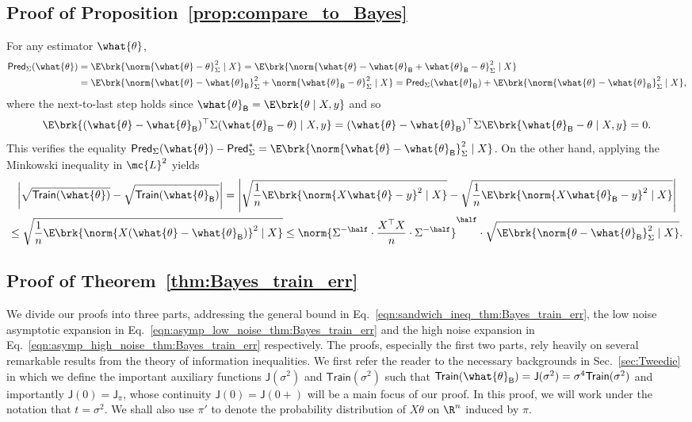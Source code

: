 \documentclass[11pt]{article}
\newcommand{\bysest}{\what{\theta}_{\mathsf{B}}}
\newcommand{\trerr}{\mathsf{Train}}
\newcommand{\prerr}{\mathsf{Pred}}
\newcommand{\tfunc}{\mathsf{Train}}
\newcommand{\jfunc}{\mathsf{J}}
\begin{document}
\subsection{Proof of Proposition~\ref{prop:compare_to_Bayes}}
    For any estimator $\what{\theta}$,
\begin{align}
    \prerr_\Sigma(\what{\theta}) & = \E \brk{ \norm{\what{\theta} - \theta}_\Sigma^2 \mid X} = \E \brk{ \norm{\what{\theta} - \bysest+ \bysest-\theta}_\Sigma^2 \mid X} \nonumber \\
    & = \E \brk{ \norm{\what{\theta} - \bysest}_{\Sigma}^2 + \norm{\bysest -\theta}_\Sigma^2 \mid X} = \prerr_\Sigma(\bysest) + \E \brk{\norm{\what{\theta} - \bysest}_{\Sigma}^2\mid X}, \nonumber 
\end{align}
where the next-to-last step holds since $\bysest=\E\brk{\theta\mid X,y}$ and so
\[\E\brk{(\what{\theta}-\bysest)^\top\Sigma(\bysest-\theta)\mid X,y} = (\what{\theta}-\bysest)^\top\Sigma\E\brk{\bysest-\theta\mid X,y}=0.\]This verifies the equality $\prerr_\Sigma(\what{\theta}) - \prerr_\Sigma^* = \E \brk{\norm{\what{\theta} - \bysest}_{\Sigma}^2\mid X}$. On the other hand, applying the Minkowski inequality in $\mc{L}^2$ yields
\begin{multline*}
    \left|\sqrt{\trerr(\what{\theta})} - \sqrt{\trerr(\bysest)} \right| = \left|\sqrt{\frac{1}{n} \E \brk{\norm{X \what{\theta} - y}^2 \mid X}} -  \sqrt{\frac{1}{n} \E \brk{\norm{X \bysest - y}^2 \mid X}}\right| \nonumber \\
     \leq \sqrt{\frac{1}{n} \E \brk{\norm{X (\what{\theta} - \bysest)}^2\mid X}}
    \leq \norm{\Sigma^{-\half} \cdot \frac{X^\top X}{n} \cdot \Sigma^{-\half}}^{\half} \cdot \sqrt{\E \brk{\norm{\theta - \bysest}_\Sigma^2\mid X}}.
\end{multline*}

\subsection{Proof of Theorem~\ref{thm:Bayes_train_err}} \label{proof:Bayes_train_err}
We divide our proofs into three parts, addressing the general bound in Eq.~\eqref{eqn:sandwich_ineq_thm:Bayes_train_err}, the low noise asymptotic expansion in Eq.~\eqref{eqn:asymp_low_noise_thm:Bayes_train_err} and the high noise expansion in Eq.~\eqref{eqn:asymp_high_noise_thm:Bayes_train_err} respectively. The proofs, especially the first two parts, rely heavily on several remarkable results from the theory of information inequalities. We first refer the reader to the necessary backgrounds in Sec.~\ref{sec:Tweedie} in which we define the important auxiliary functions $\jfunc(\sigma^2)$ and $\tfunc(\sigma^2)$ such that $\trerr(\bysest) = \jfunc(\sigma^2) = \sigma^4 \tfunc(\sigma^2)$ and importantly $\jfunc(0) = \jfunc_\pi$, whose continuity $\jfunc(0) = \jfunc(0+)$ will be a main focus of our proof. In this proof, we will work under the notation that $t=\sigma^2$. We shall also use $\pi'$ to denote the probability distribution of $X\theta$ on $\R^n$ induced by $\pi$.
\end{document}
